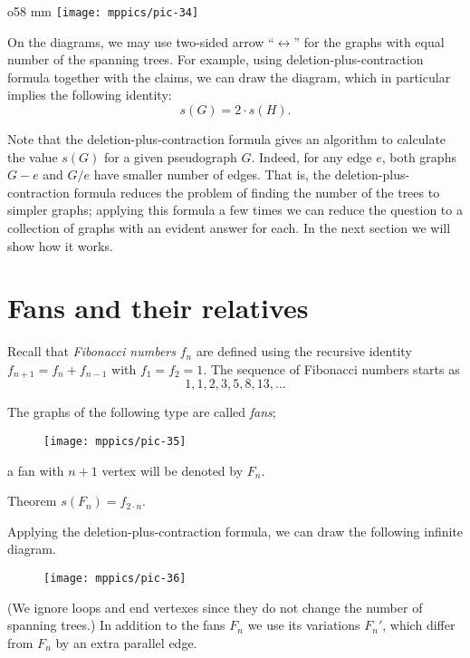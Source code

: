 \begin{wrapfigure}{o}{58 mm}
\vskip-0mm
\centering
\texttt{[image: mppics/pic-34]}
\vskip-0mm
\end{wrapfigure}

On the diagrams, we may use two-sided arrow ``$\leftrightarrow$'' for the graphs with equal number of the spanning trees.
For example, using deletion-plus-contraction formula together with the claims, we can draw the diagram, which in particular implies the following identity:
\[s(G)=2\cdot s(H).\]

Note that the deletion-plus-contraction formula gives an algorithm to calculate  the value $s(G)$ for a given pseudograph $G$.
Indeed, for any edge $e$, both graphs $G- e$ and $G/e$ have smaller number of edges.
That is, the deletion-plus-contraction formula reduces the problem of finding the number of the trees to simpler graphs;
applying this formula a few times we can reduce the question to a collection of graphs with an evident answer for each.
In the next section we will show how it works.


 
\section*{Fans and their relatives}



Recall that \emph{Fibonacci numbers} $f_n$ are defined using the recursive identity 
$f_{n+1}=f_n+f_{n-1}$
with $f_1=f_2=1$.
The sequence of Fibonacci numbers starts as
\[1,1,2,3,5,8,13,\dots\]

The graphs of the following type are called \label{page:fan}\emph{fans}; 
\begin{figure}[h!]
\centering
\texttt{[image: mppics/pic-35]}
\end{figure}
a fan with $n+1$ vertex will be denoted by $F_n$. 

\begin{thm}{Theorem}\label{thm:fans}
$s(F_n)=f_{2\cdot n}$.
\end{thm}

Applying the deletion-plus-contraction formula, we can draw the following infinite diagram.
\begin{figure}[h!]
\centering
\texttt{[image: mppics/pic-36]}
\end{figure}
(We ignore loops and end vertexes since they do not change the number of spanning trees.)
In addition to the fans $F_n$ we use its variations $F_n'$, which differ from $F_n$ by an extra parallel edge.

